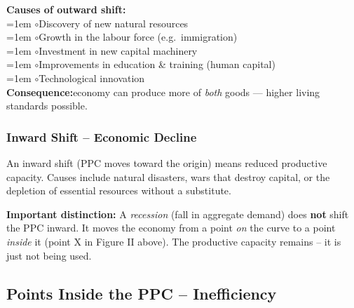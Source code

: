 \documentclass[11pt, a4paper, twoside]{book}
\begin{document}
\begin{diagrambox}
{%
}{%
\textbf{\color{CurveNavy}Causes of outward shift:}\\[6pt]
{\small%
\hangindent=1em \textcolor{CurveGold}{$\circ$}\enspace Discovery of new natural resources\\[3pt]
\hangindent=1em \textcolor{CurveGold}{$\circ$}\enspace Growth in the labour force (e.g.\ immigration)\\[3pt]
\hangindent=1em \textcolor{CurveGold}{$\circ$}\enspace Investment in new capital machinery\\[3pt]
\hangindent=1em \textcolor{CurveGold}{$\circ$}\enspace Improvements in education \& training (human capital)\\[3pt]
\hangindent=1em \textcolor{CurveGold}{$\circ$}\enspace Technological innovation}\\[10pt]
\textbf{\color{CurveGold}Consequence:}\enspace economy can produce more of \emph{both} goods --- higher living standards possible.%
}
\end{diagrambox}

\subsubsection{Inward Shift -- Economic Decline}

An inward shift (PPC moves toward the origin) means reduced productive capacity. Causes include natural disasters, wars that destroy capital, or the depletion of essential resources without a substitute.

\begin{tcolorbox}[
  enhanced, colback=LightGold, colframe=GoldAccent,
  arc=0pt, boxrule=0.7pt,
  left=8pt, right=8pt, top=6pt, bottom=6pt
]
\textbf{\color{NavyPrimary}Important distinction:} A \emph{recession} (fall in aggregate demand) does \textbf{not} shift the PPC inward. It moves the economy from a point \emph{on} the curve to a point \emph{inside} it (point X in Figure II above). The productive capacity remains -- it is just not being used.
\end{tcolorbox}

\subsection{Points Inside the PPC -- Inefficiency}
\end{document}
